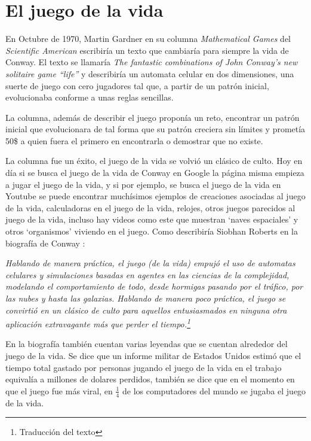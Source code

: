 \section{El juego de la vida}

En Octubre de 1970, Martin Gardner en su columna \textit{Mathematical Games} del \textit{Scientific American} \cite{Gardner1970} escribir\'ia un texto que cambiar\'ia para siempre la vida de Conway. El texto se llamar\'ia \textit{The fantastic combinations of John Conway's new solitaire game ``life''} y describir\'ia un automata celular en dos dimensiones, una suerte de juego con cero jugadores tal que, a partir de un patr\'on inicial, evolucionaba conforme a unas reglas sencillas.

La columna, adem\'as de describir el juego propon\'ia un reto, encontrar un patr\'on inicial que evolucionara de tal forma que su patr\'on creciera sin l\'imites y promet\'ia 50\$ a quien fuera el primero en encontrarla o demostrar que no existe.

La columna fue un \'exito, el juego de la vida se volvi\'o un cl\'asico de culto. Hoy en d\'ia si se busca el juego de la vida de Conway en Google la p\'agina misma empieza a jugar el juego de la vida, y si por ejemplo, se busca el juego de la vida en Youtube se puede encontrar much\'isimos ejemplos de creaciones asociadas al juego de la vida, calculadoras en el juego de la vida, relojes, otros juegos parecidos al juego de la vida, incluso hay videos como este \cite{YTEpicLife} que muestran `naves espaciales' y otros `organismos' viviendo en el juego. Como describir\'ia Siobhan Roberts en la biograf\'ia de Conway \cite{Roberts2015-ur}:

\textit{Hablando de manera pr\'actica, el juego (de la vida) empuj\'o el uso de automatas celulares y simulaciones basadas en agentes en las ciencias de la complejidad, modelando el comportamiento de todo, desde hormigas pasando por el tr\'afico, por las nubes y hasta las galaxias. Hablando de manera poco pr\'actica, el juego se convirti\'o en un cl\'asico de culto para aquellos entusiasmados en ninguna otra aplicaci\'on extravagante m\'as que perder el tiempo.\footnote{Traducci\'on del texto}}

En la biograf\'ia tambi\'en cuentan varias leyendas que se cuentan alrededor del juego de la vida. Se dice que un informe militar de Estados Unidos estim\'o que el tiempo total gastado por personas jugando el juego de la vida en el trabajo equival\'ia a millones de dolares perdidos, tambi\'en se dice que en el momento en que el juego fue m\'as viral, en $\frac{1}{4}$ de los computadores del mundo se jugaba el juego de la vida.

